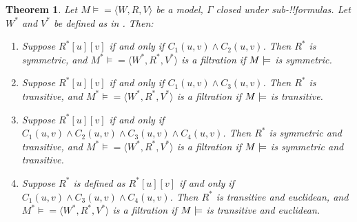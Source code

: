 \documentclass[10pt,a4paper]{article}
\makeatletter
\theoremstyle{plain}
\newtheorem{thm}{Theorem}[section]
\theoremstyle{definition}
\theoremstyle{remark}
\newcommand*{\ollabel}[1]{\label{#1}}
\newcommand{\olref}{\@ifnextchar[{\olref@i}{\olref@final}}
\def\olref@i[#1]{\@ifnextchar[{\olref@ii}{\olref@final}}
\def\olref@ii[#1]{\@ifnextchar[{\olref@iii}{\olref@final}}
\def\olref@iii[#1]{\olref@final}
\def\olref@final#1{\ref{#1}}
\providecommand{\mModel}[2]{\ensuremath{#1 \models #2}}
\providecommand{\tuple}[1]{\langle #1 \rangle}
\makeatother
\begin{document}
\begin{thm}\ollabel{thm:more-filtrations}
  Let $\mModel{M} =\tuple{W,R,V}$ be a model, $\Gamma$ closed under
  sub-!!{formula}s. Let $W^*$ and $V^*$ be defined as in
  \olref[fil]{defn:filtration}. Then:
  \begin{enumerate}
  \item Suppose $R^*[u][v]$ if and only if $C_1(u, v) \land
    C_2(u,v)$. Then $R^*$ is symmetric, and $\mModel{M^*} =
    \tuple{W^*,R^*,V^*}$ is a filtration if $\mModel{M}$ is symmetric.
  \item Suppose $R^*[u][v]$ if and only if $C_1(u, v)
    \land C_3(u,v)$. Then $R^*$ is transitive, and
    $\mModel{M^*}=\tuple{W^*,R^*,V^*}$ is a filtration if $\mModel{M}$
    is transitive.
  \item Suppose $R^*[u][v]$ if and only if $C_1(u, v) \land C_2(u,v)
    \land C_3(u,v) \land C_4(u,v)$. Then $R^*$ is symmetric and
    transitive, and $\mModel{M^*}=\tuple{W^*,R^*,V^*}$ is a filtration
    if $\mModel{M}$ is symmetric and transitive.
  \item Suppose $R^*$ is defined as $R^*[u][v]$ if and only if $C_1(u,
    v) \land C_3(u,v) \land C_4(u,v)$. Then $R^*$ is transitive and
    euclidean, and $\mModel{M^*}=\tuple{W^*,R^*,V^*}$ is a filtration
    if $\mModel{M}$ is transitive and euclidean.
  \end{enumerate}
\end{thm}
\end{document}
